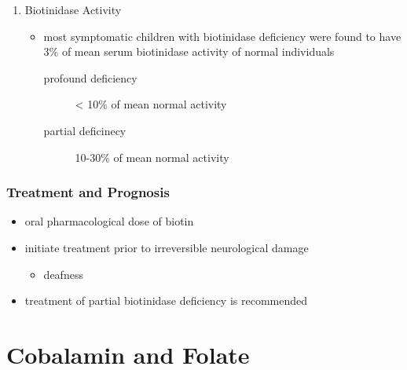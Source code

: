 \documentclass[12pt]{scrartcl}
\begin{document}
\begin{enumerate}
\item Biotinidase Activity
\label{sec:org8ebd455}
\begin{itemize}
\item most symptomatic children with biotinidase deficiency were found to
have 3\% of mean serum biotinidase activity of normal individuals
\begin{description}
\item[{profound deficiency}] \textless{} 10\% of mean normal activity
\item[{partial deficinecy}] 10-30\% of mean normal activity
\end{description}
\end{itemize}
\end{enumerate}

\subsubsection{Treatment and Prognosis}
\label{sec:org473bd55}
\begin{itemize}
\item oral pharmacological dose of biotin
\item initiate treatment prior to irreversible neurological damage
\begin{itemize}
\item deafness
\end{itemize}
\item treatment of partial biotinidase deficiency is recommended
\end{itemize}

\section{Cobalamin and Folate}
\label{sec:orge134a66}
\end{document}

